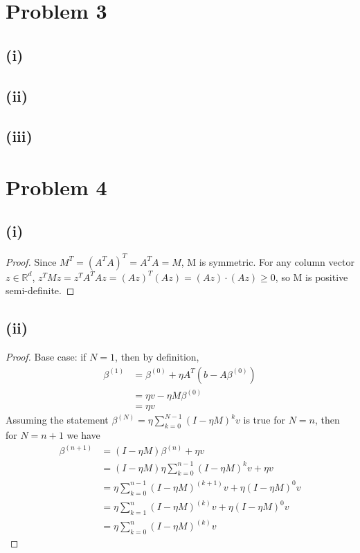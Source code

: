 \documentclass[twoside,11pt]{homework}
\date{02/21/2020}
\begin{document}
\maketitle



\section*{Problem 3} 
\subsection*{(i)}
\subsection*{(ii)}
\subsection*{(iii)}


\section*{Problem 4} 
\subsection*{(i)}
	\begin{proof}
		Since $M^{T} = (A^{T}A)^{T} = A^{T}A = M$, M is symmetric. 
		For any column vector $z\in \mathbb{R}^d$, $z^TMz = z^TA^TAz = (Az)^T (Az) = (Az)\cdot(Az) \geq 0$, 
		so M is positive semi-definite.
	\end{proof}
\subsection*{(ii)}
	\begin{proof}
		Base case: if $N=1$, then by definition, 
		\begin{align*}
			\beta^{(1)} &= \beta^{(0)}+ \eta  A^{T} (b-A \beta^{(0)}) \\
			&= \eta v - \eta M \beta^{(0)} \\
			&= \eta v 
		\end{align*}
		Assuming the statement $\beta^{(N)} = \eta \sum_{k=0}^{N-1} (I-\eta M)^k v$ is true for $N=n$, then for $N=n+1$ we have
		\begin{align*}
			\beta^{(n+1)} &= (I-\eta M) \beta^{(n)} + \eta v \tag{definition} \\
			&= (I-\eta M) \eta  \sum_{k=0}^{n-1} (I-\eta M)^k v + \eta v \tag{induction hypothesis} \\
			&= \eta  \sum_{k=0}^{n-1} (I-\eta M)^{(k+1)} v + \eta (I-\eta M)^0 v \\
			&= \eta  \sum_{k=1}^{n} (I-\eta M)^{(k)} v + \eta (I-\eta M)^0 v \\
			&= \eta  \sum_{k=0}^{n} (I-\eta M)^{(k)} v
		\end{align*}
	\end{proof}
\end{document}
